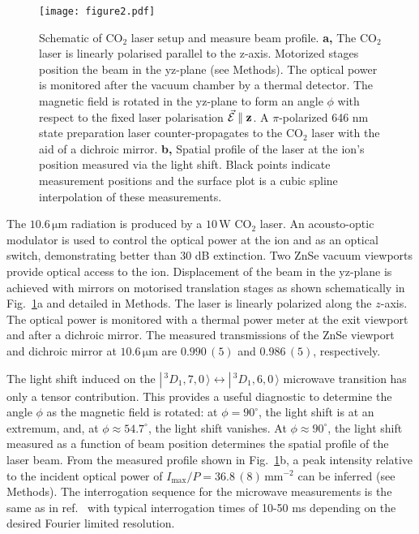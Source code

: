 \documentclass[pra,aps,showpacs,floatfix,twocolumn,nofootinbib,citeautoscript]{revtex4-1}
\def\ket#1{|\,#1 \,\rangle}
\newcommand{\fref}[1]{Fig.~\ref{#1}}
\begin{document}
\begin{figure}
\texttt{[image: figure2.pdf]}
\caption{Schematic of CO$_2$ laser setup and measure beam profile. {\bf a,}  The CO$_2$ laser is linearly polarised parallel to the z-axis. Motorized stages position the beam in the yz-plane (see Methods). The optical power is monitored after the vacuum chamber by a thermal detector. The magnetic field is rotated in the yz-plane to form an angle $\phi$ with respect to the fixed laser polarisation $\vec{\mathcal{E}}\parallel \bf{z}$.  A $\pi$-polarized 646 nm state preparation laser counter-propagates to the CO$_2$ laser with the aid of a dichroic mirror. {\bf b,} Spatial profile of the laser at the ion's position measured via the light shift. Black points indicate measurement positions and the surface plot is a cubic spline interpolation of these measurements.}
\label{fig:waist}
\end{figure}

The $10.6\,\mathrm{\mu m}$ radiation is produced by a $10\,\mathrm{W}$ CO$_2$ laser. An acousto-optic modulator is used to control the optical power at the ion and as an optical switch, demonstrating better than 30 dB extinction.  Two ZnSe vacuum viewports provide optical access to the ion.  Displacement of the beam in the yz-plane is achieved with mirrors on motorised translation stages as shown schematically in \fref{fig:waist}a and detailed in Methods. The laser is linearly polarized along the $z$-axis. The optical power is monitored with a thermal power meter at the exit viewport and after a dichroic mirror. The measured transmissions of the ZnSe viewport and dichroic mirror at $10.6\,\mathrm{\mu}$m are $0.990\,(5)$ and $0.986\,(5)$, respectively. 

The light shift induced on the $\ket{^3D_1,7,0} \leftrightarrow \ket{^3D_1,6,0}$ microwave transition has only a tensor contribution. This provides a useful diagnostic to determine the angle $\phi$ as the magnetic field is rotated: at $\phi=90^\circ$, the light shift is at an extremum, and, at $\phi \approx 54.7^\circ$, the light shift vanishes.  At $\phi\approx90^\circ$, the light shift measured as a function of beam position determines the spatial profile of the laser beam.  From the measured profile shown in \fref{fig:waist}b, a peak intensity relative to the incident optical power of $I_{\mathrm{max}}/P = 36.8 \,(8) \,\mathrm{mm}^{-2}$ can be inferred (see Methods).  The interrogation sequence for the microwave measurements is the same as in ref.~\cite{dean2017} with typical interrogation times of 10-50 ms depending on the desired Fourier limited resolution.
\end{document}
